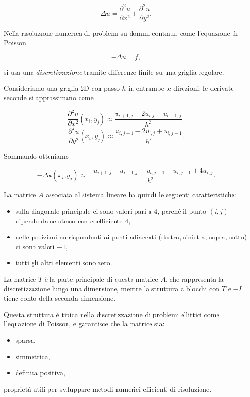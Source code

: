 \documentclass[12pt,a4paper]{article}
\begin{document}
\[
\Delta u = \frac{\partial^2 u}{\partial x^2} + \frac{\partial^2 u}{\partial y^2}.
\]

Nella risoluzione numerica di problemi su domini continui, come l’equazione di Poisson

\[
-\Delta u = f,
\]

si usa una \emph{discretizzazione} tramite differenze finite su una griglia regolare.

Consideriamo una griglia 2D con passo \(h\) in entrambe le direzioni; le derivate seconde si approssimano come

\[
\frac{\partial^2 u}{\partial x^2}(x_i,y_j) \approx \frac{u_{i+1,j} - 2 u_{i,j} + u_{i-1,j}}{h^2},
\]
\[
\frac{\partial^2 u}{\partial y^2}(x_i,y_j) \approx \frac{u_{i,j+1} - 2 u_{i,j} + u_{i,j-1}}{h^2}.
\]

Sommando otteniamo

\[
-\Delta u(x_i,y_j) \approx \frac{-u_{i+1,j} - u_{i-1,j} - u_{i,j+1} - u_{i,j-1} + 4 u_{i,j}}{h^2}.
\]

La matrice \(A\) associata al sistema lineare ha quindi le seguenti caratteristiche:

\begin{itemize}
    \item sulla diagonale principale ci sono valori pari a \(4\), perché il punto \((i,j)\) dipende da se stesso con coefficiente \(4\),
    \item nelle posizioni corrispondenti ai punti adiacenti (destra, sinistra, sopra, sotto) ci sono valori \(-1\),
    \item tutti gli altri elementi sono zero.
\end{itemize}

La matrice \(T\) è la parte principale di questa matrice \(A\), che rappresenta la discretizzazione lungo una dimensione, mentre la struttura a blocchi con \(T\) e \(-I\) tiene conto della seconda dimensione.

Questa struttura è tipica nella discretizzazione di problemi ellittici come l’equazione di Poisson, e garantisce che la matrice sia:

\begin{itemize}
    \item sparsa,
    \item simmetrica,
    \item definita positiva,
\end{itemize}

proprietà utili per sviluppare metodi numerici efficienti di risoluzione.
\end{document}
